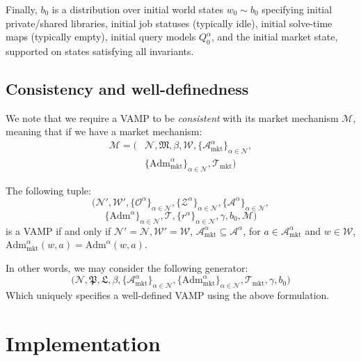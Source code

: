 \documentclass[letterpaper]{article} %
\begin{document}

Finally, $b_0$ is a distribution over initial world states $w_0\sim b_0$ specifying initial private/shared libraries, initial job statuses
(typically idle), initial solve-time maps (typically empty), initial query models $Q^\alpha_0$, and the initial market state, supported on
states satisfying all invariants.

\subsection{Consistency and well-definedness}

We note that we require a VAMP to be \textit{consistent} with its market mechanism $\mathscr{M}$, meaning that if we have a market mechanism:
\begin{align*}
\mathscr{M} =\Big(&\mathcal{N}, \mathfrak{M},\beta, \mathcal{W},\{\mathcal{A}^\alpha_{\mathrm{mkt}}\}_{\alpha\in\mathcal{N}},
\\&\{\mathrm{Adm}^\alpha_{\mathrm{mkt}}\}_{\alpha\in\mathcal{N}},\mathcal{T}_{\mathrm{mkt}}\Big)
\end{align*}

The following tuple:
\[
\Big(\mathcal{N}',\mathcal{W}',\{\mathcal{O}^\alpha\}_{\alpha\in\mathcal{N}},\{\mathcal{Z}^\alpha\}_{\alpha\in\mathcal{N}},\{\mathcal{A}^\alpha\}_{\alpha\in\mathcal{N}},
\]\[\{\mathrm{Adm}^\alpha\}_{\alpha\in\mathcal{N}},\mathcal{T},
\{r^\alpha\}_{\alpha\in\mathcal{N}},\gamma,b_0, \mathscr{M}\Big)
\]
is a VAMP if and only if $\mathcal N' = \mathcal N, \mathcal W' = \mathcal W$, $\mathcal{A}^\alpha_\mathrm{mkt}\subseteq\mathcal{A}^\alpha$, for $a \in \mathcal{A}^\alpha_\mathrm{mkt}$ and $w \in \mathcal W$,$\mathrm{Adm}^\alpha_\mathrm{mkt}(w,a)=\mathrm{Adm}^\alpha(w,a)$. 

In other words, we may consider the following generator:
\[
\Big(
\mathcal{N},\mathfrak{P},\mathfrak{L}, \beta, \{\mathcal{A}^\alpha_{\mathrm{mkt}}\}_{\alpha\in\mathcal{N}},\{\mathrm{Adm}^\alpha_{\mathrm{mkt}}\}_{\alpha\in\mathcal{N}},\mathcal{T}_{\mathrm{mkt}},\gamma,b_0
\Big)
\]
Which uniquely specifies a well-defined VAMP using the above formulation.




\section{Implementation}
\label{sec:impl}
\end{document}
